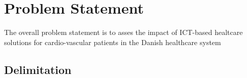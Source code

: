 \chapter{Problem Statement}

The overall problem statement is to asses the impact of ICT-based healtcare solutions for cardio-vascular patients in the Danish healthcare system

\section{Delimitation}



